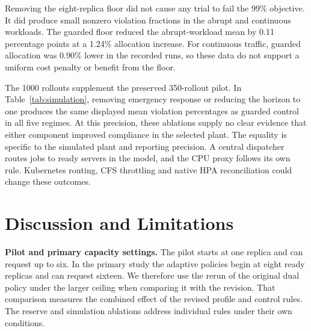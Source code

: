 \documentclass[10pt,twocolumn,a4paper]{article}
\begin{document}
Removing the eight-replica floor did not cause any trial to fail the 99\% objective. It did produce small nonzero violation fractions in the abrupt and continuous workloads. The guarded floor reduced the abrupt-workload mean by 0.11 percentage points at a 1.24\% allocation increase. For continuous traffic, guarded allocation was 0.90\% lower in the recorded runs, so these data do not support a uniform cost penalty or benefit from the floor.

\begin{table}[t]\centering\small\setlength{\tabcolsep}{3pt}
\caption{Independent-plant means across 25 paired seeds per regime. All ablation columns show violation percentages. The central queue omits Kubernetes routing and CFS details, so these values are not live-cluster outcomes. Full eight-policy scores are retained in the artifact.}\label{tab:simulation}
\ifdim\wd\databox>\textwidth\relax\resizebox{\textwidth}{!}{\usebox{\databox}}\else\usebox{\databox}\fi
\end{table}

The 1000 rollouts supplement the preserved 350-rollout pilot. In Table~\ref{tab:simulation}, removing emergency response or reducing the horizon to one produces the same displayed mean violation percentages as guarded control in all five regimes. At this precision, these ablations supply no clear evidence that either component improved compliance in the selected plant. The equality is specific to the simulated plant and reporting precision. A central dispatcher routes jobs to ready servers in the model, and the CPU proxy follows its own rule. Kubernetes routing, CFS throttling and native HPA reconciliation could change these outcomes.



\section{Discussion and Limitations}
\textbf{Pilot and primary capacity settings.} The pilot starts at one replica and can request up to six. In the primary study the adaptive policies begin at eight ready replicas and can request sixteen. We therefore use the rerun of the original dual policy under the larger ceiling when comparing it with the revision. That comparison measures the combined effect of the revised profile and control rules. The reserve and simulation ablations address individual rules under their own conditions.
\end{document}
